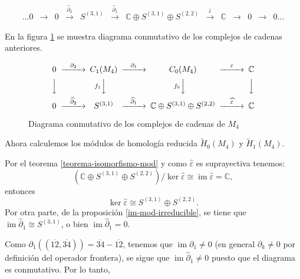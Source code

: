 \documentclass[12pt]{book}
\theoremstyle{definition}
\DeclareMathOperator{\im}{im}
\newcounter{in}
\newcounter{ini}
\begin{document}
\begin{small}
    \[
    \begin{array}{ccccccccccccc}
      \dots 0 & \rightarrow & 0 &
      \stackrel{\widehat\partial_{2}}{\rightarrow} &  S^{(3,1)} &
      \stackrel{\widehat\partial_{1}}{\rightarrow} & \mathbb{C} \oplus
      S^{(3,1)}\oplus S^{(2,2)} & \stackrel{\widehat\varepsilon}{\rightarrow} &
      \mathbb{C} & \rightarrow  & 0 & \rightarrow & 0 \dots
    \end{array} 
    \]
  \end{small}

En la figura \ref{fig:diagrama-conmutativo4} se muestra diagrama
conmutativo de los complejos de cadenas anteriores.
\begin{figure}[!hbtp]
  \centering
  \[
  \begin{CD}
    0 @>{\partial_{2}}>> C_{1}(M_{4}) @>{\partial_{1}}>> C_{0}(M_{4}) @>{\varepsilon}>> \mathbb{C}\\
    @VVV   @V{f_{1}}VV   @V{f_{0}}VV   @VVV    \\
    0 @>{\widehat\partial_{2}}>> S^{(3,1)} @>{\widehat\partial_{1}}>>
    \mathbb{C} \oplus S^{(3,1)}\oplus S^{(2,2)} @>{\widehat
      \varepsilon}>> \mathbb{C}
  \end{CD}
  \]
  
  \caption{Diagrama conmutativo de los complejos de cadenas de $M_{4}$}
\label{fig:diagrama-conmutativo4}
\end{figure}

Ahora calculemos los módulos de homología reducida $\widetilde H_{0}(M_{4})$ y
$\widetilde H_{1}(M_{4})$.

Por el teorema \ref{teorema-isomorfismo-mod} y como
$\widehat\varepsilon$ es suprayectiva tenemos:
$$(\mathbb{C} \oplus S^{(3,1)}\oplus S^{(2,2)})/\ker\widehat\varepsilon\cong\im\widehat\varepsilon=\mathbb{C},$$
entonces
\begin{equation}
\label{ker-0-4}
\ker\widehat\varepsilon\cong S^{(3,1)}\oplus S^{(2,2)}.
\end{equation}
Por otra parte, de la proposición \ref{im-mod-irreducible}, se tiene
que $\im\widehat\partial_{1}\cong S^{(3,1)}$, o bien $\im\widehat\partial_{1}=0$.

Como $\partial_{1}((\overline{12},\overline{34}))=\overline{34}-\overline{12}$,
tenemos que $\im\partial_{1}\neq 0$ (en general $\partial_{k}\neq 0$
por definición del operador frontera), se sigue que
$\im\widehat\partial_{1}\neq 0$ puesto que el diagrama es
conmutativo. Por lo tanto, 
\end{document}
